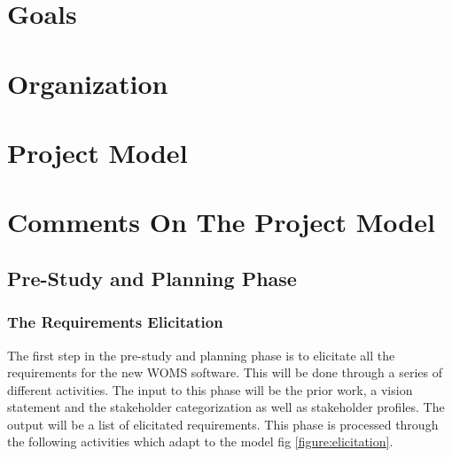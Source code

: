 \documentclass[a4paper]{article}
\begin{document}
\section{Goals} 
\label{sec:goals}


\section{Organization}
\label{sec:organization}


\section{Project Model} 
\label{sec:project_model}


\section{Comments On The Project Model} 
\label{sec:comments_on_the_project_model}

\subsection{Pre-Study and Planning Phase}
\label{sub:pre_study_and_planning_phase}

\subsubsection{The Requirements Elicitation}
\label{subsub:the_requirements_elicitation}

The first step in the pre-study and planning phase is to elicitate all the requirements for the new WOMS software. This will be done through a series of different activities. The input to this phase will be the prior work, a vision statement and the stakeholder categorization as well as stakeholder profiles. The output will be a list of elicitated requirements. This phase is processed through the following activities which adapt to the model fig \ref{figure:elicitation}. 
\end{document}
